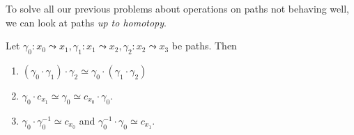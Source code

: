 \documentclass[a4paper]{article}
\begin{document}
To solve all our previous problems about operations on paths not behaving well, we can look at paths \emph{up to homotopy}.
\begin{prop}
  Let $\gamma_0: x_0 \leadsto x_1, \gamma_1: x_1 \leadsto x_2, \gamma_2: x_2 \leadsto x_3$ be paths. Then
  \begin{enumerate}
    \item $(\gamma_0 \cdot \gamma_1)\cdot \gamma_2 \simeq \gamma_0 \cdot (\gamma_1\cdot \gamma_2)$
    \item $\gamma_0 \cdot c_{x_1}\simeq \gamma_0 \simeq c_{x_0}\cdot \gamma_0$.
    \item $\gamma_0 \cdot \gamma_0^{-1}\simeq c_{x_0}$ and $\gamma_0^{-1}\cdot \gamma_0 \simeq c_{x_1}$.
  \end{enumerate}
\end{prop}
\end{document}
